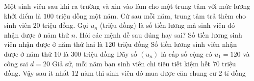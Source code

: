\begin{ex}%
	Một sinh viên sau khi ra trường và xin vào làm cho một trung tâm với mức lương khởi điểm là $100$  triệu đồng một năm. Cứ sau mỗi năm, trung tâm trả thêm cho sinh viên $20$ triệu đồng. Gọi $u_n$ (triệu đồng) là số tiền lương mà sinh viên đó nhận được ở năm thứ $n$. Hỏi các mệnh đề sau đúng hay sai?
	 \choiceTF
		{\True Số tiền lương sinh  viên nhận được ở năm thứ hai là $120$ triệu đồng}
		{Số tiền lương sinh viên nhận được  ở năm thứ $10$ là $300$ triệu đồng}
		 {Dãy số $\left(u_n \right)$ là cấp số cộng có $u_1=120$ và công sai $d=20$}
		{Giả sử, mỗi năm bạn sinh viên chi tiêu tiết kiệm  hết $70$ triệu đồng. Vậy sau ít nhất $12$ năm thì sinh viên đó mua được căn chung cư $2$ tỉ đồng}
\end{ex}

